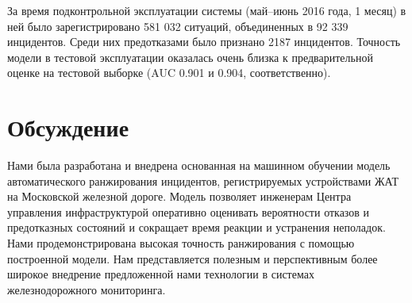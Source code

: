 За время подконтрольной эксплуатации системы (май--июнь 2016 года, 1 месяц) в ней было зарегистрировано 581 032 ситуаций, объединенных в 92 339 инцидентов. Среди них предотказами было признано 2187 инцидентов. %
Точность модели в тестовой эксплуатации оказалась очень близка к предварительной оценке на тестовой выборке (AUC 0.901 и 0.904, соответственно).






\section{Обсуждение}
Нами была разработана и внедрена основанная на машинном обучении модель автоматического ранжирования инцидентов, регистрируемых устройствами ЖАТ на Московской железной дороге. Модель позволяет инженерам Центра управления инфраструктурой оперативно оценивать вероятности отказов и предотказных состояний и сокращает время реакции и устранения неполадок. Нами продемонстрирована высокая точность ранжирования с помощью построенной модели. Нам представляется полезным и перспективным более широкое внедрение предложенной нами технологии в системах железнодорожного мониторинга.  


